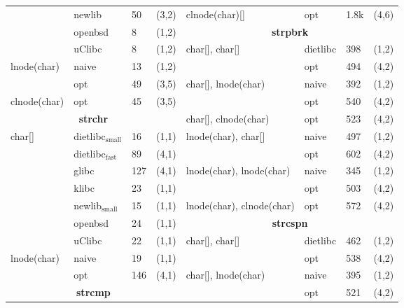\begin{figure}[H]
\begin{scriptsize}
\begin{tabular}{lllclllc}
       & newlib & 50 & (3,2) &                                              clnode(char)[] & opt & 1.8k & (4,6) \\
       & openbsd & 8 & (1,2) &                                                \multicolumn{4}{c}{\bf strpbrk} \\ 
       & uClibc & 8 & (1,2) &                                                 char[], char[] & dietlibc & 398 & (1,2) \\
lnode(char) & naive & 13 & (1,2) &                                                          & opt      & 494 & (4,2) \\
            & opt & 49 & (3,5) &                                              char[], lnode(char) & naive & 392 & (1,2) \\
clnode(char) & opt & 45 & (3,5) &                                                                & opt & 540 & (4,2) \\ 
 \multicolumn{4}{c}{\bf strchr} &                                                 char[], clnode(char) & opt & 523 & (4,2) \\
char[] & dietlibc$\mathrm{_{small}}$ & 16 & (1,1) &                           lnode(char), char[] & naive & 497 & (1,2) \\
       & dietlibc$\mathrm{_{fast}}$ & 89 & (4,1) &                                               & opt & 602 & (4,2) \\ 
       & glibc & 127 & (4,1) &                                                lnode(char), lnode(char) & naive & 345 & (1,2) \\
       & klibc & 23 & (1,1) &                                                                           & opt & 503 & (4,2) \\
       & newlib$\mathrm{_{small}}$ & 15 & (1,1) &                         lnode(char), clnode(char) & opt & 572 & (4,2) \\
       & openbsd & 24 & (1,1) &                                             \multicolumn{4}{c}{\bf strcspn} \\
       & uClibc & 22 & (1,1) &                                              char[], char[] & dietlibc & 462 & (1,2) \\ 
lnode(char) & naive & 19 & (1,1) &                                                        & opt      & 538 & (4,2) \\ 
            & opt & 146 & (4,1) &                                           char[], lnode(char) & naive & 395 & (1,2) \\
\multicolumn{4}{c}{\bf strcmp}   &                                     & opt & 521 & (4,2) \\

\end{tabular}
\end{scriptsize}
\end{figure}
